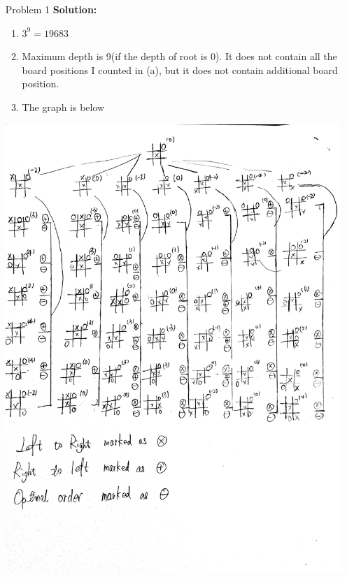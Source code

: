 \normalfont\documentclass[letterpaper,11pt]{article}
\begin{document}
\setlength{\parindent}{2ex}
\newcommand{\header}{
	\noindent {}
}
\bigskip
\header

\begin{enumerate}
\item[Problem 1]\textbf{Solution:}\par
	\begin{enumerate}
		\item $3^9 = 19683$
		\item Maximum depth is 9(if the depth of root is $0$). It does not contain all the board positions I counted in (a), but it does not contain additional board position.
		\item The graph is below\par
	\end{enumerate}
	\includegraphics[width=0.72\linewidth]{1.jpg}
	

\end{enumerate}
\end{document}
